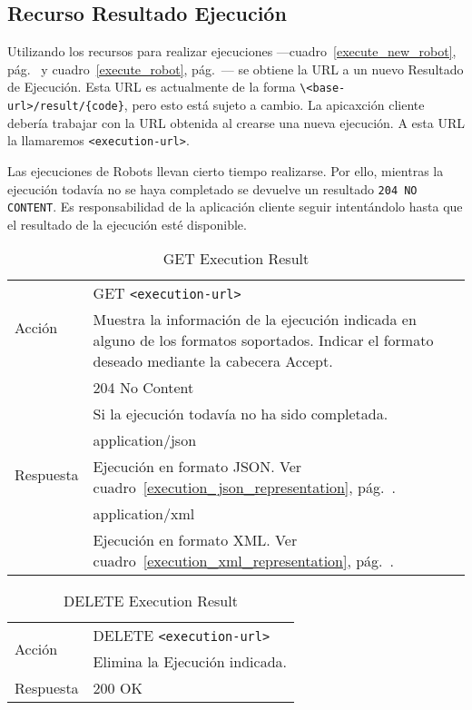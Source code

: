 \subsection{Recurso Resultado Ejecución}

Utilizando los recursos para realizar ejecuciones
---cuadro~\ref{execute_new_robot}, pág.~\pageref{execute_new_robot} y
cuadro~\ref{execute_robot}, pág.~\pageref{execute_robot}--- se obtiene
la URL a un nuevo Resultado de Ejecución. Esta URL es actualmente de
la forma \verb+\<base-url>/result/{code}+, pero esto está sujeto a
cambio. La apicaxción cliente debería trabajar con la URL obtenida al
crearse una nueva ejecución. A esta URL la llamaremos
\verb+<execution-url>+.

Las ejecuciones de Robots llevan cierto tiempo realizarse. Por ello,
mientras la ejecución todavía no se haya completado se devuelve un
resultado \verb+204 NO CONTENT+. Es responsabilidad de la aplicación
cliente seguir intentándolo hasta que el resultado de la ejecución
esté disponible.

\begin{table}
\begin{tabularx}{\textwidth}{l X}
\multirow{2}{*}{Acción}
 & GET \verb+<execution-url>+ \\
 & Muestra la información de la ejecución indicada en alguno de los
formatos soportados. Indicar el formato deseado mediante la cabecera Accept.\\ \hline
\multirow{6}{*}{Respuesta}
& 204 No Content \\
& Si la ejecución todavía no ha sido completada.\\ \cline{2-2}
& application/json \\
& Ejecución en formato JSON. Ver cuadro~\ref{execution_json_representation}, pág.~\pageref{execution_json_representation}.\\ \cline{2-2}
& application/xml \\
& Ejecución en formato XML. Ver cuadro~\ref{execution_xml_representation}, pág.~\pageref{execution_xml_representation}. \\
\end{tabularx}
\caption{GET Execution Result}
\label{get_execution_result}
\end{table}

\begin{table}
\begin{tabularx}{\textwidth}{l X}
\multirow{2}{*}{Acción}
 & DELETE \verb+<execution-url>+\\
 & Elimina la Ejecución indicada.\\ \hline
\multirow{1}{*}{Respuesta}
 & 200 OK \\
\end{tabularx}
\caption{DELETE Execution Result}
\label{delete_execution_result}
\end{table}
\newpage


